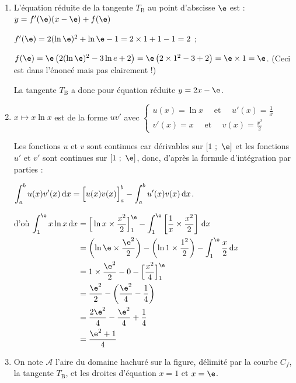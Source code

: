 \begin{enumerate}
\item L'équation réduite de la tangente  $T_{\mathrm{B}}$ au point d'abscisse $\e$ est : $y= f'(\e)(x-\e )+ f(\e)$

$f'(\e)= 2(\ln \e)^{2} + \ln \e - 1 = 2 \times 1 + 1 - 1 = 2$ ;

$f(\e) = \e \left(2(\ln \e)^{2}-3 \ln e+2 \right)= \e \left(2 \times 1^2- 3 + 2\right)=  \e\times 1= \e$. (Ceci est dans l'énoncé mais pas clairement !)

La tangente $T_{\mathrm{B}}$ a donc pour équation réduite $y=2 x-\e$.

	\item $x \longmapsto x \ln x$ est de la forme $u v'$ avec $\begin{cases}u(x)=\ln x \quad\text { et }  \quad u'(x)=\frac{1}{x} \\ v'(x)=x \quad\text { et } \quad v(x)=\frac{x^2}{2}\end{cases}$

Les fonctions $u$ et $v$ sont continues car dérivables sur $\left[1~;~\e\right]$ et les fonctions $u'$ et $v'$ sont continues sur $\left[1~;~\e\right]$, donc, d'après la formule d'intégration par parties :

$\displaystyle \int_{a}^{b} u(x)v'(x)\, \mathrm{d}x = \Big [u(x)v(x)\strut\Big]_{a}^{b} - \int_{a}^{b} u'(x)v(x) \, \mathrm{d}x$.

d'où
$\begin{aligned}[t]
	\int_1^{\e}  x\ln x  \, \mathrm{d}x& =\Big[\ln x \times \dfrac{x^2}{2} \Big]_1^{\e}-\int_1^{\e} \left[\dfrac{1}{x} \times \dfrac{x^2}{2}\right] \, \mathrm{d}x\\
	& = \left( \ln \e \times \dfrac{\e^2}{2} \right) -\left(\ln 1 \times \dfrac{1^2}{2}\right) - \int_1^{\e} \dfrac{x}{2} \, \mathrm{d}x\\
	& = 1 \times \dfrac{\e^2}{2}- 0 - \Big[ \dfrac{x^2}{4} \Big]_1^{\e}\\
	& = \dfrac{\e^2}{2} - \left(\dfrac{\e^2}{4}-\dfrac{1}{4} \right)\\
	&= \dfrac{2\e^2}{4}- \dfrac{\e^2}{4}+\dfrac{1}{4} \\
	&= \dfrac{\e^{2}+1}{4}
\end{aligned}$




	\item On note $\mathcal{A}$ l'aire du domaine hachuré sur la figure, délimité par la courbe $C_{f}$, la tangente $T_{\mathrm{B}}$, et les droites d'équation $x=1$ et $x=\e$.


\end{enumerate}

